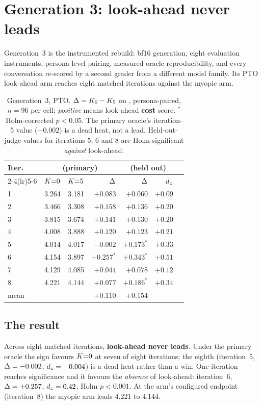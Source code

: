 \section{Generation 3: look-ahead never leads}
\label{sec:gen3}

Generation~3 is the instrumented rebuild: bf16 generation, eight evaluation instruments,
persona-level pairing, measured oracle reproducibility, and every conversation re-scored by a
second grader from a different model family. Its PTO look-ahead arm reaches eight matched
iterations against the myopic arm.

\begin{table}[t]
\centering\small
\begin{tabular}{@{}lrrrrrr@{}}
\toprule
\textbf{Iter.} & \multicolumn{3}{c}{\textbf{\primaryjudge{}} (primary)} & \multicolumn{2}{c}{\textbf{\heldout{}} (held out)} \\
\cmidrule(lr){2-4}\cmidrule(lr){5-6}
 & $K{=}0$ & $K{=}5$ & $\Delta$ & $\Delta$ & $d_z$ \\
\midrule
1 & 3.264 & 3.181 & $+0.083$ & $+0.060$ & $+0.09$ \\
2 & 3.466 & 3.308 & $+0.158$ & $+0.136$ & $+0.20$ \\
3 & 3.815 & 3.674 & $+0.141$ & $+0.130$ & $+0.20$ \\
4 & 4.008 & 3.888 & $+0.120$ & $+0.123$ & $+0.21$ \\
5 & 4.014 & 4.017 & $-0.002$ & $+0.173^{*}$ & $+0.33$ \\
6 & 4.154 & 3.897 & $+0.257^{*}$ & $+0.343^{*}$ & $+0.51$ \\
7 & 4.129 & 4.085 & $+0.044$ & $+0.078$ & $+0.12$ \\
8 & 4.221 & 4.144 & $+0.077$ & $+0.186^{*}$ & $+0.34$ \\
\midrule
mean & & & $\mathbf{+0.110}$ & $\mathbf{+0.154}$ & \\
\bottomrule
\end{tabular}
\caption{Generation~3, PTO. $\Delta = K_0 - K_5$ on \QQ{}, persona-paired, $n = 96$ per cell;
\emph{positive} means look-ahead \textbf{cost} score. $^{*}$ Holm-corrected $p < 0.05$. The
primary oracle's iteration-5 value ($-0.002$) is a dead heat, not a lead. Held-out-judge values
for iterations 5, 6 and 8 are Holm-significant \emph{against} look-ahead.}
\label{tab:gen3}
\end{table}

\subsection{The result}
Across eight matched iterations, \textbf{look-ahead never leads}. Under the primary oracle the
sign favours $K{=}0$ at seven of eight iterations; the eighth (iteration~5,
$\Delta = -0.002$, $d_z = -0.004$) is a dead heat rather than a win. One iteration reaches
significance and it favours the \emph{absence} of look-ahead: iteration~6, $\Delta = +0.257$,
$d_z = 0.42$, Holm $p < 0.001$. At the arm's configured endpoint (iteration~8) the myopic arm
leads $4.221$ to $4.144$.

